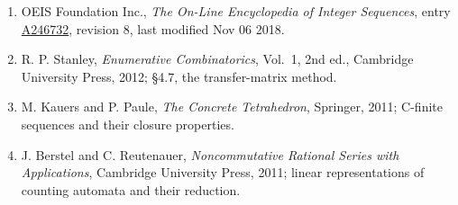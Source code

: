 \documentclass[11pt]{article}
\theoremstyle{definition}
\begin{document}
\begin{enumerate}

\item OEIS Foundation Inc., \emph{The On-Line Encyclopedia of Integer Sequences}, entry \href{https://oeis.org/A246732}{A246732}, revision 8, last modified Nov 06 2018.

\item R. P. Stanley, \emph{Enumerative Combinatorics}, Vol.~1, 2nd ed., Cambridge University Press, 2012; \S4.7, the transfer-matrix method.

\item M. Kauers and P. Paule, \emph{The Concrete Tetrahedron}, Springer, 2011; C-finite sequences and their closure properties.

\item J. Berstel and C. Reutenauer, \emph{Noncommutative Rational Series with Applications}, Cambridge University Press, 2011; linear representations of counting automata and their reduction.

\end{enumerate}
\end{document}
